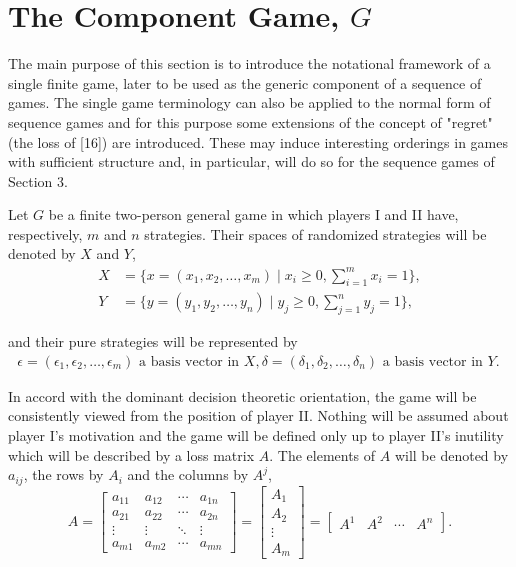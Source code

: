 \documentclass[11pt]{article}
\theoremstyle{boldStyle}
\begin{document}
\section{The Component Game, $G$}

The main purpose of this section is to introduce the notational framework of a single finite game, later to be used as the generic component of a sequence of games. The single game terminology can also be applied to the normal form of sequence games and for this purpose some extensions of the concept of "regret" (the loss of [16]) are introduced. These may induce interesting orderings in games with sufficient structure and, in particular, will do so for the sequence games of Section 3.

\medbreak

Let $G$ be a finite two-person general game in which players I and II have, respectively, $m$ and $n$ strategies. Their spaces of randomized strategies will be denoted by $X$ and $Y$,
\begin{equation} \label{eq:1}
        \begin{aligned}
            X &= \{x = (x_1, x_2, \ldots, x_m) \mid x_i \geq 0, \sum_{i=1}^m x_i = 1\}, \\
            Y &= \{y = (y_1, y_2, \ldots, y_n) \mid y_j \geq 0, \sum_{j=1}^n y_j = 1\},
        \end{aligned}
\end{equation}

and their pure strategies will be represented by
\begin{equation} \label{eq:2}
    \begin{aligned}
        \epsilon = (\epsilon_1, \epsilon_2, \ldots, \epsilon_m) \text{ a basis vector in } X,
        \delta = (\delta_1, \delta_2, \ldots, \delta_n) \text{ a basis vector in } Y.
\   \end{aligned}   
\end{equation}

In accord with the dominant decision theoretic orientation, the game will be consistently viewed from the position of player II. Nothing will be assumed about player I's motivation and the game will be defined only up to player II's inutility which will be described by a loss matrix $A$. The elements of $A$ will be denoted by $a_{ij}$, the rows by $A_i$ and the columns by $A^j$,
\begin{equation} \label{eq:3}
    A = \begin{bmatrix}
    a_{11} & a_{12} & \cdots & a_{1n} \\
    a_{21} & a_{22} & \cdots & a_{2n} \\
    \vdots & \vdots & \ddots & \vdots \\
    a_{m1} & a_{m2} & \cdots & a_{mn}
    \end{bmatrix} = \begin{bmatrix} A_1 \\ A_2 \\ \vdots \\ A_m \end{bmatrix} = \begin{bmatrix} A^1 & A^2 & \cdots & A^n \end{bmatrix}.
\end{equation}
\end{document}

